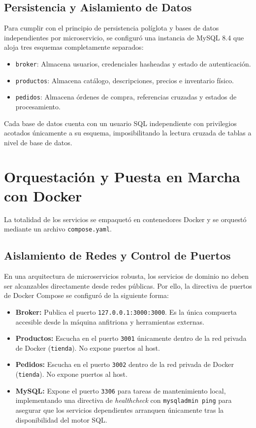 \documentclass[conference]{IEEEtran}
\begin{document}
\subsection{Persistencia y Aislamiento de Datos}
Para cumplir con el principio de persistencia políglota y bases de datos independientes por microservicio, se configuró una instancia de MySQL 8.4 que aloja tres esquemas completamente separados:
\begin{itemize}
    \item \texttt{broker}: Almacena usuarios, credenciales hasheadas y estado de autenticación.
    \item \texttt{productos}: Almacena catálogo, descripciones, precios e inventario físico.
    \item \texttt{pedidos}: Almacena órdenes de compra, referencias cruzadas y estados de procesamiento.
\end{itemize}
Cada base de datos cuenta con un usuario SQL independiente con privilegios acotados únicamente a su esquema, imposibilitando la lectura cruzada de tablas a nivel de base de datos.

\section{Orquestación y Puesta en Marcha con Docker}
La totalidad de los servicios se empaquetó en contenedores Docker y se orquestó mediante un archivo \texttt{compose.yaml}.

\subsection{Aislamiento de Redes y Control de Puertos}
En una arquitectura de microservicios robusta, los servicios de dominio no deben ser alcanzables directamente desde redes públicas. Por ello, la directiva de puertos de Docker Compose se configuró de la siguiente forma:
\begin{itemize}
    \item \textbf{Broker:} Publica el puerto \texttt{127.0.0.1:3000:3000}. Es la única compuerta accesible desde la máquina anfitriona y herramientas externas.
    \item \textbf{Productos:} Escucha en el puerto \texttt{3001} únicamente dentro de la red privada de Docker (\texttt{tienda}). No expone puertos al host.
    \item \textbf{Pedidos:} Escucha en el puerto \texttt{3002} dentro de la red privada de Docker (\texttt{tienda}). No expone puertos al host.
    \item \textbf{MySQL:} Expone el puerto \texttt{3306} para tareas de mantenimiento local, implementando una directiva de \textit{healthcheck} con \texttt{mysqladmin ping} para asegurar que los servicios dependientes arranquen únicamente tras la disponibilidad del motor SQL.
\end{itemize}
\end{document}
